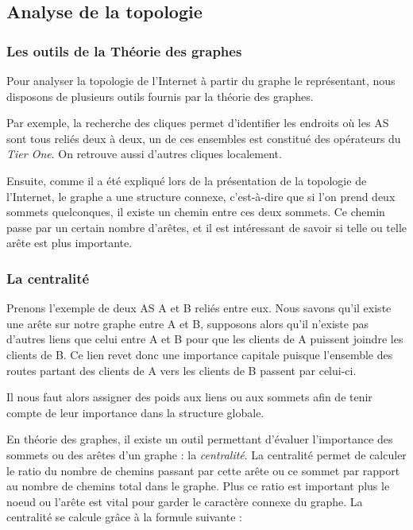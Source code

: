 

%

\subsection{Analyse de la topologie}

\subsubsection{Les outils de la Th\'eorie des graphes}
\par
Pour analyser la topologie de l'Internet \`a partir du graphe le repr\'esentant, nous disposons de plusieurs outils fournis par la th\'eorie des graphes.

Par exemple, la recherche des cliques permet d'identifier les endroits o\`u les AS sont tous reli\'es deux \`a deux, un de ces ensembles est constitu\'e des op\'erateurs du \textit{Tier One}. On retrouve aussi d'autres cliques localement.
\par
Ensuite, comme il a été expliqu\'e lors de la pr\'esentation de la topologie de l'Internet, le graphe a une structure connexe, c'est-\`a-dire que si l'on prend deux sommets quelconques, il existe un chemin entre ces deux sommets.
Ce chemin passe par un certain nombre d'ar\^etes, et il est int\'eressant de savoir si telle ou telle ar\^ete est plus importante.

\subsubsection{La centralit\'e}

\par
Prenons l'exemple de deux AS A et B reli\'es entre eux. Nous savons qu'il existe une ar\^ete sur notre graphe entre A et B, supposons alors qu'il n'existe pas d'autres liens que celui entre A et B pour que les clients de A puissent joindre les clients de B. Ce lien revet donc une importance capitale puisque l'ensemble des routes partant des clients de A vers les clients de B passent par celui-ci.
\par
Il nous faut alors assigner des poids aux liens ou aux sommets afin de tenir compte de leur importance dans la structure globale.

\par
En th\'eorie des graphes, il existe un outil permettant d'\'evaluer l'importance des sommets ou des ar\^etes d'un graphe : la \textit{centralit\'e}. La centralit\'e permet de calculer le ratio du nombre de chemins passant par cette ar\^ete ou ce sommet par rapport au nombre de chemins total dans le graphe. Plus ce ratio est important plus le noeud ou l'ar\^ete est vital pour garder le caract\`ere connexe du graphe. La centralit\'e se calcule gr\^ace \`a la formule suivante :

